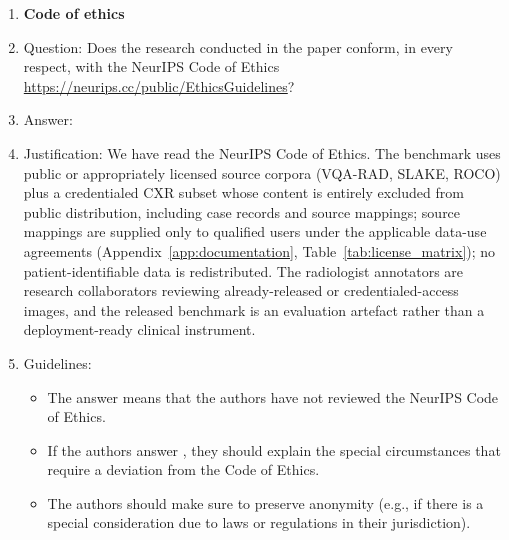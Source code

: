 \begin{enumerate}
\item {\bf Code of ethics}
    \item[] Question: Does the research conducted in the paper conform, in every respect, with the NeurIPS Code of Ethics \url{https://neurips.cc/public/EthicsGuidelines}?
    \item[] Answer: \answerYes{}
    \item[] Justification: We have read the NeurIPS Code of Ethics. The benchmark uses public or appropriately licensed source corpora (VQA-RAD, SLAKE, ROCO) plus a credentialed CXR subset whose content is entirely excluded from public distribution, including case records and source mappings; source mappings are supplied only to qualified users under the applicable data-use agreements (Appendix~\ref{app:documentation}, Table~\ref{tab:license_matrix}); no patient-identifiable data is redistributed. The radiologist annotators are research collaborators reviewing already-released or credentialed-access images, and the released benchmark is an evaluation artefact rather than a deployment-ready clinical instrument.
    \item[] Guidelines:
    \begin{itemize}
        \item The answer \answerNA{} means that the authors have not reviewed the NeurIPS Code of Ethics.
        \item If the authors answer \answerNo, they should explain the special circumstances that require a deviation from the Code of Ethics.
        \item The authors should make sure to preserve anonymity (e.g., if there is a special consideration due to laws or regulations in their jurisdiction).
    \end{itemize}



\end{enumerate}
